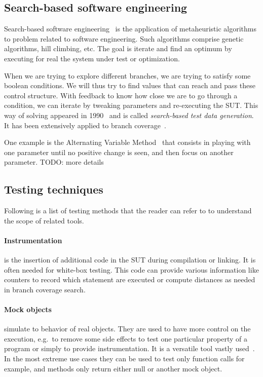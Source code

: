 \documentclass{llncs2e/llncs}
\makeatletter
\def\todo#1{{\color{red}TODO\@: #1}}
\makeatother
\begin{document}
\subsection{Search-based software engineering}
\label{sbse}

Search-based software engineering~\cite{harman2001search} is the application of
metaheuristic algorithms to problem related to software engineering. Such
algorithms comprise genetic algorithms, hill climbing, etc. The goal is iterate
and find an optimum by executing for real the system under test or optimization.

When we are trying to explore different branches, we are trying to satisfy some
boolean conditions. We will thus try to find values that can reach and pass
these control structure. With feedback to know how close we are to go through a
condition, we can iterate by tweaking parameters and re-executing the SUT\@.
This way of solving appeared in 1990~\cite{korel1990automated} and is called
\textit{search-based test data generation}. It has been extensively applied to
branch
coverage~\cite{mcminn2004search,lakhotia2007multi,mcminn2007iguana,Kim2017ts}.

One example is the Alternating Variable Method~\cite{mcminn2016avmf} that
consists in playing with one parameter until no positive change is seen, and
then focus on another parameter. \todo{more details}


\subsection{Testing techniques} %
\label{techniques}

Following is a list of testing methods that the reader can refer to to
understand the scope of related tools.

\paragraph{Instrumentation} is the insertion of additional code in the SUT
during compilation or linking. It is often needed for white-box testing. This
code can provide various information like counters to record which statement are
executed or compute distances as needed in branch coverage search.

\paragraph{Mock objects} simulate to behavior of real objects. They are used to
have more control on the execution, e.g.\ to remove some side effects to test
one particular property of a program or simply to provide instrumentation. It is
a versatile tool vastly
used~\cite{mackinnon2000endo,taneja2010moda,freeman2004mock,tillmann2006mock}.
In the most extreme use cases they can be used to test only function calls for
example, and methods only return either null or another mock object.
\end{document}
